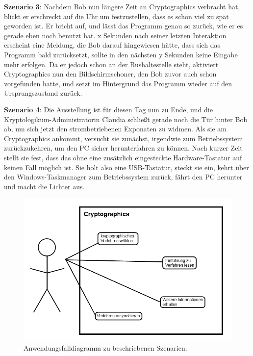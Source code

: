 \documentclass{article}
\begin{document}
\textbf{Szenario 3}:
Nachdem Bob nun längere Zeit an Cryptographics verbracht hat, blickt er erschreckt auf die Uhr um festzustellen, dass es schon viel zu spät geworden ist. Er bricht auf, und lässt das Programm genau so zurück, wie er es gerade eben noch benutzt hat. x Sekunden nach seiner letzten Interaktion erscheint eine Meldung, die Bob darauf hingewiesen hätte, dass sich das Programm bald zurücksetzt, sollte in den nächsten y Sekunden keine Eingabe mehr erfolgen. Da er jedoch schon an der Bushaltestelle steht, aktiviert Cryptographics nun den Bildschirmschoner, den Bob zuvor auch schon vorgefunden hatte, und setzt im Hintergrund das Programm wieder auf den Ursprungszustand zurück.

\textbf{Szenario 4}:
Die Ausstellung ist für diesen Tag nun zu Ende, und die Kryptologikum-Administratorin Claudia schließt gerade noch die Tür hinter Bob ab, um sich jetzt den strombetriebenen Exponaten zu widmen. Als sie am Cryptographics ankommt, versucht sie zunächst, irgendwie zum Betriebssystem zurückzukehren, um den PC sicher herunterfahren zu können. Nach kurzer Zeit stellt sie fest, dass das ohne eine zusätzlich eingesteckte Hardware-Tastatur auf keinen Fall möglich ist. Sie holt also eine USB-Tastatur, steckt sie ein, kehrt über den Windows-Taskmanager zum Betriebssystem zurück, fährt den PC herunter und macht die Lichter aus.

\begin{figure}[h!]
  \centering
    \includegraphics[width=\textwidth]{resources/usecase1}
  \caption{Anwendungsfalldiagramm zu beschriebenen Szenarien.}
\end{figure}
\end{document}

